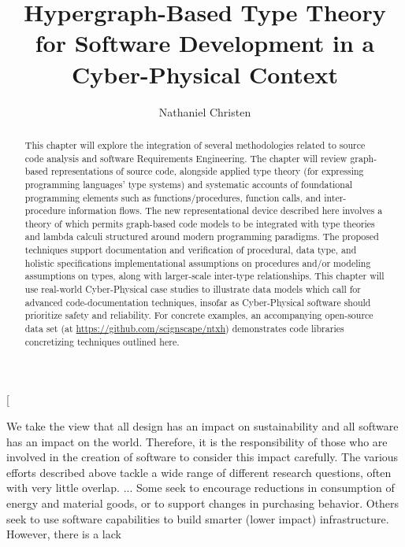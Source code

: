 \documentclass[11pt,twocolumn]{article}
\begin{document}
\title{Hypergraph-Based Type Theory 
for Software Development in a Cyber-Physical Context}
\author[1]{Nathaniel Christen}
\twocolumn[\begin{@twocolumnfalse}
\maketitle{}
\begin{abstract}This chapter will explore the integration of several methodologies 
related to source code analysis and software Requirements 
Engineering.  The chapter will review 
graph-based representations of source code, 
alongside applied type theory (for expressing 
programming languages' type systems) and 
systematic accounts of foundational programming 
elements such as functions/procedures, function calls, and 
inter-procedure information flows.  The new 
representational device described here involves a theory 
of  which permits  
graph-based code models to be integrated with type theories 
and lambda calculi structured around modern 
programming paradigms.   
The proposed techniques support documentation and 
verification of procedural, data type, and holistic 
specifications \mdash{} implementational assumptions on procedures  
and/or modeling assumptions on types, along with 
larger-scale inter-type relationships.  
This chapter will use real-world Cyber-Physical case studies 
to illustrate data models which call for advanced 
code-documentation techniques, insofar as Cyber-Physical 
software should prioritize safety and reliability.    
For concrete examples, an accompanying open-source data set (at
\url{https://github.com/scignscape/ntxh}) 
demonstrates code libraries concretizing 
techniques outlined here.
\end{abstract} 
\newsavebox{\qboxi}
\begin{lrbox}{\qboxi}
\begin{frquote}
{\sadded}We take the view that all design has an impact on sustainability and all software has an impact on the world. Therefore, it is the responsibility of those who are involved in the creation of software to consider this impact carefully.  The various efforts described above tackle a wide range of different research questions, often with very little overlap. ... {\eadded}
Some seek to encourage reductions in consumption of energy
and  material  goods,  or  to  support  changes  in  purchasing
behavior.  Others  seek  to  use  software  capabilities  to  build
smarter (lower impact) infrastructure. However, there is a lack

\end{frquote}
\end{lrbox}
\end{@twocolumnfalse}
\end{document}

